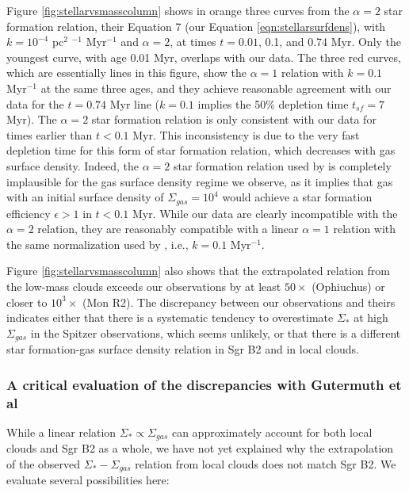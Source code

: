 \documentclass[twocolumn]{aastex61}
\begin{document}
Figure \ref{fig:stellarvsmasscolumn}  shows in orange three curves from the
\citet{Gutermuth2011a} $\alpha=2$ star formation relation, their Equation 7
(our Equation \ref{eqn:stellarsurfdens}),
with $k=10^{-4}$ pc$^{2}$ \msun$^{-1}$ Myr$^{-1}$ and $\alpha=2$, at times
$t=0.01$, 0.1, and 0.74 Myr.  Only the youngest curve, with age 0.01 Myr,
overlaps with our data.  The three red curves, which are essentially lines in
this figure, show the $\alpha=1$ relation with $k=0.1$ Myr$^{-1}$ at the same
three ages, and they achieve reasonable agreement with our data for the $t=0.74$
Myr line ($k=0.1$ \permyr implies the 50\% depletion time $t_{sf}=7$ Myr).  The
$\alpha=2$ star formation relation  is only consistent with our
data for times earlier than $t<0.1$ Myr.  This inconsistency is due to the very
fast depletion time for this form of star formation relation, which decreases
with gas surface density.  Indeed, the $\alpha=2$ star formation relation used
by \citet{Gutermuth2011a} is completely implausible for the gas surface density
regime we observe, as it implies that gas with an initial surface density of
$\Sigma_{gas}=10^4$ \msun \perspc would achieve a star formation efficiency
$\epsilon>1$ in $t<0.1$ Myr.  While our data are clearly incompatible with the
$\alpha=2$ relation, they are reasonably compatible with a linear $\alpha=1$
relation with the same normalization used by \citet{Gutermuth2011a}, i.e.,
$k=0.1$ Myr$^{-1}$.



Figure \ref{fig:stellarvsmasscolumn} also shows that the extrapolated relation
from the low-mass clouds exceeds our observations by at least $50\times$
(Ophiuchus) or closer to $10^3\times$ (Mon R2).   The discrepancy between our
observations and theirs indicates either that there is a systematic tendency to
overestimate $\Sigma_*$ at high $\Sigma_{gas}$ in the Spitzer observations,
which seems unlikely, or that there is a different star formation-gas surface
density relation in Sgr B2 and in local clouds.


\subsubsection{A critical evaluation of the discrepancies with Gutermuth et al}
\label{sec:gutermuthdiscrepancy}
While a linear relation $\Sigma_* \propto \Sigma_{gas}$ can approximately
account for both local clouds and Sgr B2 as a whole, we have not yet explained
why the extrapolation of the observed $\Sigma_* - \Sigma_{gas}$ relation from
local clouds does not match Sgr B2.  We evaluate several possibilities here:
\end{document}
